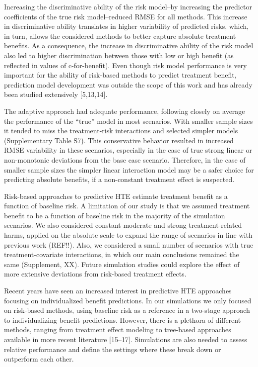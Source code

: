 \documentclass[]{elsarticle} %
\begin{document}
Increasing the discriminative ability of the risk model--by increasing
the predictor coefficients of the true risk model--reduced RMSE for all
methods. This increase in discriminative ability translates in higher
variability of predicted risks, which, in turn, allows the considered
methods to better capture absolute treatment benefits. As a consequence,
the increase in discriminative ability of the risk model also led to
higher discrimination between those with low or high benefit (as
reflected in values of c-for-benefit). Even though risk model
performance is very important for the ability of risk-based methods to
predict treatment benefit, prediction model development was outside the
scope of this work and has already been studied extensively
{[}5,13,14{]}.

The adaptive approach had adequate performance, following closely on
average the performance of the ``true'' model in most scenarios. With
smaller sample sizes it tended to miss the treatment-risk interactions
and selected simpler models (Supplementary Table S7). This conservative
behavior resulted in increased RMSE variability in these scenarios,
especially in the case of true strong linear or non-monotonic deviations
from the base case scenario. Therefore, in the case of smaller sample
sizes the simpler linear interaction model may be a safer choice for
predicting absolute benefits, if a non-constant treatment effect is
suspected.

Risk-based approaches to predictive HTE estimate treatment benefit as a
function of baseline risk. A limitation of our study is that we assumed
treatment benefit to be a function of baseline risk in the majority of
the simulation scenarios. We also considered constant moderate and
strong treatment-related harms, applied on the absolute scale to expand
the range of scenarios in line with previous work (REF!!). Also, we
considered a small number of scenarios with true treatment-covariate
interactions, in which our main conclusions remained the same
(Supplement, XX). Future simulation studies could explore the effect of
more extensive deviations from risk-based treatment effects.

Recent years have seen an increased interest in predictive HTE
approaches focusing on individualized benefit predictions. In our
simulations we only focused on risk-based methods, using baseline risk
as a reference in a two-stage approach to individualizing benefit
predictions. However, there is a plethora of different methods, ranging
from treatment effect modeling to tree-based approaches available in
more recent literature {[}15--17{]}. Simulations are also needed to
assess relative performance and define the settings where these break
down or outperform each other.
\end{document}
